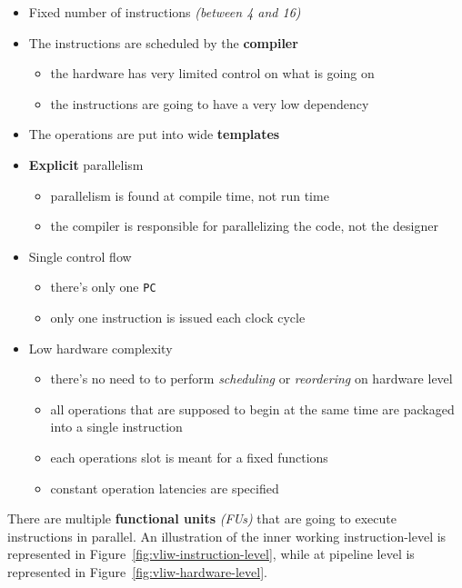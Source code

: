 \documentclass[english]{article}
\begin{document}
\begin{itemize}
  \item Fixed number of instructions \textit{(between 4 and 16)}
  \item The instructions are scheduled by the \textbf{compiler}
        \begin{itemize}
          \item the hardware has very limited control on what is going on
          \item the instructions are going to have a very low dependency
        \end{itemize}
  \item The operations are put into wide \textbf{templates}
  \item \textbf{Explicit} parallelism
        \begin{itemize}
          \item parallelism is found at compile time, not run time
          \item the compiler is responsible for parallelizing the code, not the designer
        \end{itemize}
  \item Single control flow
        \begin{itemize}
          \item there's only one \texttt{PC}
          \item only one instruction is issued each clock cycle
        \end{itemize}
  \item Low hardware complexity
        \begin{itemize}
          \item there's no need to to perform \textit{scheduling} or \textit{reordering} on hardware level
          \item all operations that are supposed to begin at the same time are packaged into a single instruction
          \item each operations slot is meant for a fixed functions
          \item constant operation latencies are specified
        \end{itemize}
\end{itemize}

There are multiple \textbf{functional units} \textit{(FUs)} that are going to execute instructions in parallel.
An illustration of the inner working instruction-level is represented in Figure~\ref{fig:vliw-instruction-level}, while at pipeline level is represented in Figure~\ref{fig:vliw-hardware-level}.
\end{document}
